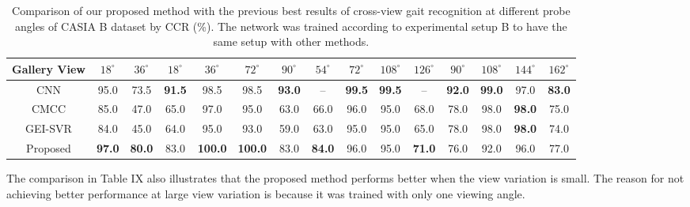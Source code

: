 \begin{table}
	\caption{Comparison of our proposed method with the previous best results of cross-view gait recognition at different probe angles of CASIA B dataset by CCR (\%). The network was trained according to experimental setup B to have the same setup with other methods. \label{table:comp_casia_b_cross_view}}
	
	{\begin{tabular*}{20pc}{ccccc ccccc ccccc}\hline  
				
	

	Gallery View &$18^{\circ}$ &$36^{\circ}$ &$18^{\circ}$ &$36^{\circ}$ &$72^{\circ}$ &$90^{\circ}$ &$54^{\circ}$ &$72^{\circ}$ &$108^{\circ}$ &$126^{\circ}$ &$90^{\circ}$ &$108^{\circ}$ &$144^{\circ}$ &$162^{\circ}$
	\\ \hline\rule{0pt}{2ex}

	CNN &95.0 &73.5 &\textbf{91.5} &98.5 &98.5 &\textbf{93.0} &-- &\textbf{99.5} &\textbf{99.5} &-- &\textbf{92.0} &\textbf{99.0} &97.0 &\textbf{83.0} \\ \hline\rule{0pt}{2ex}
	
	CMCC &85.0 &47.0 &65.0 &97.0 &95.0 &63.0 &66.0 &96.0 &95.0 &68.0 &78.0 &98.0 &\textbf{98.0} &75.0 \\ \hline\rule{0pt}{2ex}
	
	GEI-SVR &84.0 &45.0 &64.0 &95.0 &93.0 &59.0 &63.0 &95.0 &95.0 &65.0 &78.0 &98.0 &\textbf{98.0} &74.0 \\ \hline\rule{0pt}{2ex}
	
	Proposed &\textbf{97.0} &\textbf{80.0} &83.0 &\textbf{100.0} &\textbf{100.0} &83.0 &\textbf{84.0} &96.0 &95.0 &\textbf{71.0} &76.0 &92.0 &96.0 &77.0
	\\\hline 
	
	\end{tabular*}}{} 
\end{table}

The comparison in Table IX also illustrates that the proposed method performs better when the view variation is small. The reason for not achieving better performance at large view variation is because it was trained with only one viewing angle.  







